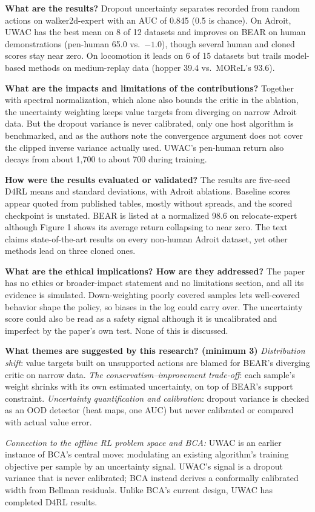 \documentclass[11pt]{article}
\newcommand{\q}[2]{\item \textbf{#1} #2}
\newcommand{\tiein}[1]{\par\smallskip\noindent\emph{Connection to the offline RL problem space and BCA:} #1\par\medskip}
\begin{document}
\begin{qna}
\q{What are the results?}
Dropout uncertainty separates recorded from random actions on walker2d-expert with an AUC of 0.845 (0.5 is chance). On Adroit, UWAC has the best mean on 8 of 12 datasets and improves on BEAR on human demonstrations (pen-human 65.0 vs.\ $-1.0$), though several human and cloned scores stay near zero. On locomotion it leads on 6 of 15 datasets but trails model-based methods on medium-replay data (hopper 39.4 vs.\ MOReL's 93.6).

\q{What are the impacts and limitations of the contributions?}
Together with spectral normalization, which alone also bounds the critic in the ablation, the uncertainty weighting keeps value targets from diverging on narrow Adroit data. But the dropout variance is never calibrated, only one host algorithm is benchmarked, and as the authors note the convergence argument does not cover the clipped inverse variance actually used. UWAC's pen-human return also decays from about 1,700 to about 700 during training.

\q{How were the results evaluated or validated?}
The results are five-seed D4RL means and standard deviations, with Adroit ablations. Baseline scores appear quoted from published tables, mostly without spreads, and the scored checkpoint is unstated. BEAR is listed at a normalized 98.6 on relocate-expert although Figure 1 shows its average return collapsing to near zero. The text claims state-of-the-art results on every non-human Adroit dataset, yet other methods lead on three cloned ones.

\q{What are the ethical implications? How are they addressed?}
The paper has no ethics or broader-impact statement and no limitations section, and all its evidence is simulated. Down-weighting poorly covered samples lets well-covered behavior shape the policy, so biases in the log could carry over. The uncertainty score could also be read as a safety signal although it is uncalibrated and imperfect by the paper's own test. None of this is discussed.

\q{What themes are suggested by this research? (minimum 3)}
\emph{Distribution shift}: value targets built on unsupported actions are blamed for BEAR's diverging critic on narrow data. \emph{The conservatism--improvement trade-off}: each sample's weight shrinks with its own estimated uncertainty, on top of BEAR's support constraint. \emph{Uncertainty quantification and calibration}: dropout variance is checked as an OOD detector (heat maps, one AUC) but never calibrated or compared with actual value error.

\end{qna}
\tiein{UWAC is an earlier instance of BCA's central move: modulating an existing algorithm's training objective per sample by an uncertainty signal. UWAC's signal is a dropout variance that is never calibrated; BCA instead derives a conformally calibrated width from Bellman residuals. Unlike BCA's current design, UWAC has completed D4RL results.}
\end{document}
